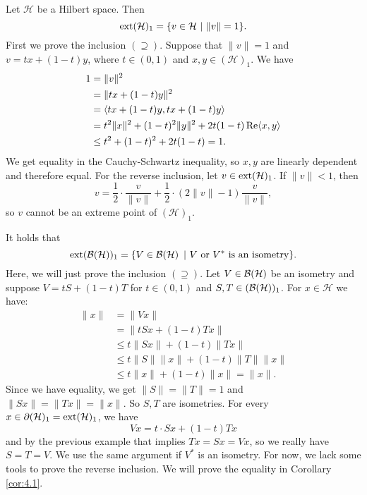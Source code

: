 \begin{example}
  Let $\mathcal{H}$ be a Hilbert space. Then 
  $$\operatorname{ext} (\mathcal{H})_1 = \{v \in \mathcal{H}\ |\ \|v\| = 1\}.$$
  First we prove the inclusion $(\supseteq)$. Suppose that 
  $\| v\| = 1$ and $v = tx + (1 - t)y$, where $t \in (0, 1)$ and $x, y \in (\mathcal{H})_1$.
  We have 
  \begin{align*}
    1 &= \| v\|^2\\
    &= \| tx + (1 - t)y\|^2\\
    &= \langle tx + (1 - t)y, tx + (1 - t)y \rangle\\
    &= t^2 \|x\|^2 + (1 - t)^2 \|y\|^2 + 2t(1 - t)\operatorname{Re} \langle x, y\rangle\\
    &\leq t^2 + (1 - t)^2 + 2t(1 - t) = 1.
  \end{align*}
  We get equality in the Cauchy-Schwartz inequality, so $x, y$ are linearly dependent and therefore equal.
  For the reverse inclusion, let $v \in \operatorname{ext} (\mathcal{H})_1$. If $\| v\| < 1$, then 
  $$v = \frac{1}{2} \cdot \frac{v}{\|v\|} + \frac{1}{2} \cdot \left(2{\|v\|} - 1 \right) \frac{v}{\|v\|},$$
  so $v$ cannot be an extreme point of $(\mathcal{H})_1$.
\end{example}

\begin{example}\label{ex:1.4}
  It holds that
  $$\operatorname{ext} (\operatorname{\mathcal{B} (\mathcal{H})})_1 = \{V \in \operatorname{\mathcal{B} (\mathcal{H})}\ |\ \textrm{$V$ or $V^*$ is an isometry}\}.$$
  Here, we will just prove the inclusion $(\supseteq)$.
  Let $V \in \operatorname{\mathcal{B} (\mathcal{H})}$  be an isometry and suppose $V = tS + (1 - t)T$
  for $t \in (0, 1)$ and $S, T \in (\operatorname{\mathcal{B} (\mathcal{H})})_1$.
  For $x \in \mathcal{H}$ we have:
  \begin{align*}
    \| x\| &= \| V x\|\\
    &= \| tSx + (1 - t)Tx\|\\
    &\leq t \|Sx\| + (1 - t) \|Tx\|\\
    &\leq t \| S\| \|x\| + (1 - t) \|T\| \|x\|\\
    &\leq t \|x\| + (1 - t)\|x\| = \|x\|. 
  \end{align*}
  Since we have equality, we get $\|S\| = \|T\| = 1$
  and $\|Sx\| = \|Tx\| = \|x\|$. So $S, T$ are isometries.
  For every $x \in \partial (\mathcal{H})_1 = \operatorname{ext} (\mathcal{H})_1$, we have 
  $$Vx = t \cdot Sx + (1 - t) Tx$$ and by the previous example that implies $Tx = Sx = Vx$,
  so we really have $S = T = V$. We use the same argument if $V^*$ is an isometry.
  For now, we lack some tools to prove the reverse inclusion. We will prove the equality in Corollary \ref{cor:4.1}.
\end{example}


